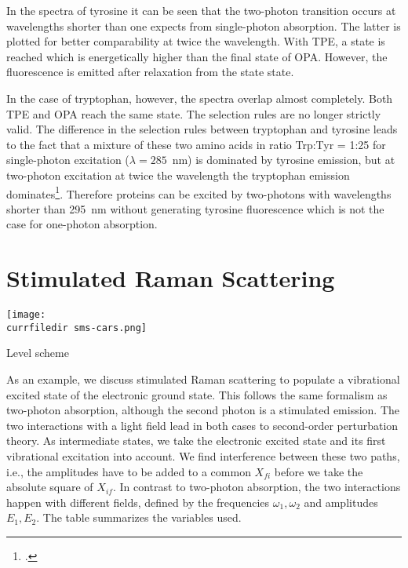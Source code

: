 In the spectra of tyrosine it can be seen that the
two-photon transition occurs at wavelengths shorter than one expects from 
 single-photon absorption. The latter is plotted for better
comparability at twice the wavelength. With
TPE, a state is reached which is energetically higher than the final state of   OPA. However, the fluorescence is emitted after relaxation from the state state.


In the case of tryptophan, however, the spectra overlap almost 
completely. Both  TPE and  OPA reach the same state.
The selection rules are no longer strictly valid. The
difference in the selection rules between tryptophan and tyrosine
leads to the fact that a mixture of these two amino acids in
ratio Trp:Tyr = 1:25 for single-photon excitation ($\lambda =
285$~nm) is dominated by tyrosine emission,  but at
two-photon excitation at twice the wavelength  the
tryptophan emission dominates\footcite{kierdaszuk95}. Therefore proteins can be excited by two-photons with  wavelengths shorter than 295~nm
without generating tyrosine fluorescence which is not the case for one-photon absorption.





\section{Stimulated Raman Scattering}


\begin{marginfigure}
\texttt{[image: \\currfiledir sms-cars.png]}
\caption{ Level scheme }
\end{marginfigure}


As an example, we discuss stimulated Raman scattering to populate a vibrational excited state of the electronic ground state. This follows the same formalism as two-photon absorption, although the second photon is a stimulated emission. The two interactions with a light field lead in both cases to second-order perturbation theory. As intermediate states, we take the electronic excited state and its first vibrational excitation into account. We find interference between these two paths, i.e., the amplitudes have to be added to a common $X_{fi}$ before we take the absolute square of $X_{if}$. In contrast to two-photon absorption, the two interactions happen with   different fields, defined by the frequencies $\omega_1,\omega_2$ and amplitudes $E_1, E_2$. The table summarizes the variables used.

